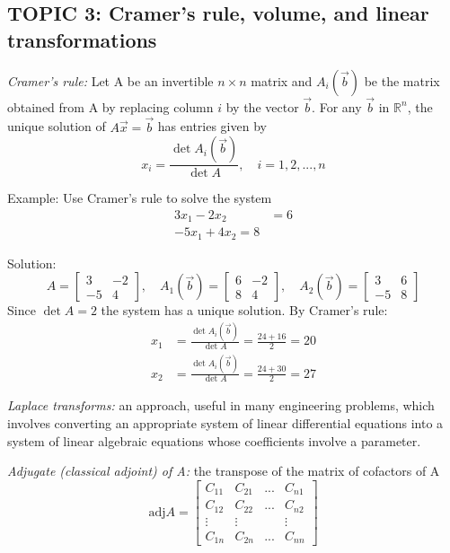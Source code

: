 \documentclass[12pt]{article} %
\newcommand{\R}{\mathbb{R}}
\begin{document}

\subsection{TOPIC 3: Cramer's rule, volume, and linear transformations}
\emph{Cramer's rule:} Let A be an invertible $n \times n$ matrix and $A_i(\vec{b})$ be the matrix obtained from A by replacing column $i$ by the vector $\vec{b}$. For any $\vec{b}$ in $\R^n$, the unique solution of $A\vec{x} = \vec{b}$ has entries given by 
$$x_i = \frac{\det A_i(\vec{b})}{\det A}, \quad i = 1, 2, ..., n$$

Example: Use Cramer's rule to solve the system
\begin{align}
	3x_1 - 2x_2 &= 6\\
	-5x_1 + 4x_2 = 8
\end{align}

Solution: 
$$A=\begin{bmatrix}
	3 & -2\\
	-5 & 4
\end{bmatrix}, \quad A_1(\vec{b}) = \begin{bmatrix}
	6 & -2\\
	8 & 4
\end{bmatrix}, \quad A_2(\vec{b}) = \begin{bmatrix}
	3 & 6\\
	-5 & 8
\end{bmatrix}$$
Since $\det A = 2$ the system has a unique solution. By Cramer's rule:
\begin{align*}
	x_1 &= \frac{\det A_i(\vec{b})}{\det A} = \frac{24 + 16}{2} = 20\\
	x_2 &= \frac{\det A_i(\vec{b})}{\det A} = \frac{24 + 30}{2} = 27
\end{align*}

\emph{Laplace transforms:} an approach, useful in many engineering problems, which involves converting an appropriate system of linear differential equations into a system of linear algebraic equations whose coefficients involve a parameter.

\emph{Adjugate (classical adjoint) of A:} the transpose of the matrix of cofactors of A
$$\text{adj}A = \begin{bmatrix}
	C_{11} & C_{21} & ... & C_{n1}\\
	C_{12} & C_{22} & ... & C_{n2}\\
	\vdots & \vdots & & \vdots\\
	C_{1n} & C_{2n} & ... & C_{nn}
\end{bmatrix}$$
\end{document}
